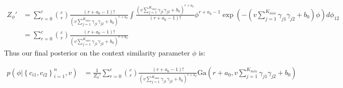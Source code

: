 \documentclass[fleqn,11pt]{wlscirep}
\begin{document}
\begin{align}
Z_{\phi}' &=\sum_{r=0}^c  \binom{c}{r} \frac{(r + a_0 - 1)!}{ \left(v \sum_{j=1}^{K_{min}} \gamma_{j1} \gamma_{j2} + b_0 \right)^{r + a_0}}  \int \frac{ \left(v \sum_{j=1}^{K_{min}} \gamma_{j1} \gamma_{j2} + b_0 \right)^{r + a_0}}{(r + a_0 - 1)!} \phi^{r + a_0 - 1} \exp \left( - \left(v \sum_{j=1}^{K_{min}} \gamma_{j1} \gamma_{j2} + b_0 \right)\phi\right) d\phi_{12} \\
&= \sum_{r=0}^c \binom{c}{r} \frac{(r + a_0 - 1)!}{ \left(v \sum_{j=1}^{K_{min}} \gamma_{j1} \gamma_{j2} + b_0 \right)^{r + a_0}} 
\end{align}
Thus our final posterior on the context similarity parameter $\phi$ is:

\begin{align}
p(\phi |  \left\{c_{i1}, c_{i2}\right\}_{i=1}^n, v) &=  \frac{1}{Z_{\phi}'} \sum_{r=0}^c  \binom{c}{r} \frac{(r + a_0 - 1)!}{ \left(v \sum_{j=1}^{K_{min}} \gamma_{j1} \gamma_{j2} + b_0 \right)^{r + a_0}} \mathrm{Ga} \left(r+ a_0, v \sum_{j=1}^{K_{min}} \gamma_{j1} \gamma_{j2} + b_0 \right)
\end{align}





\end{document}
